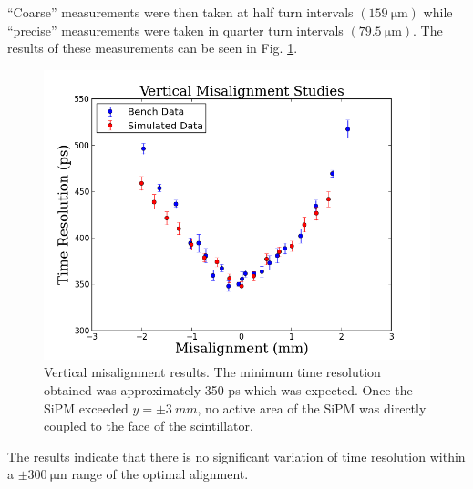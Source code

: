 ``Coarse'' measurements were then taken at half turn intervals $(159\ \mathrm{\mu m})$ while ``precise'' measurements were taken in quarter turn intervals $(79.5\ \mathrm{\mu m})$.  The results of these measurements can be seen in Fig. \ref{fig:sipm_va}.
	\begin{figure}[!htb]
	\centering
	\includegraphics[width=1.0\columnwidth]{misalignment/figs/vert_ma}
	\caption{Vertical misalignment results.  The minimum time resolution obtained was approximately 350 ps which was expected.  Once the SiPM exceeded $y = \pm 3\ mm$, no active area of the SiPM was directly coupled to the face of the scintillator.}
	\label{fig:sipm_va}
\end{figure}
The results indicate that there is no significant variation of time resolution within a $\pm 300\ \mathrm{\mu m}$ range of the optimal alignment.  

